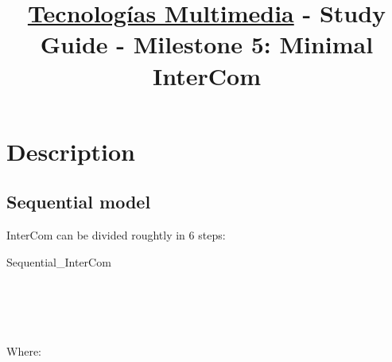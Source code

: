 \title{\href{https://www.ual.es/estudios/grados/presentacion/plandeestudios/asignatura/4015/40154321?idioma=zh_CN}{Tecnologías Multimedia} - Study Guide - Milestone 5: Minimal InterCom}

\maketitle

\section{Description}

\subsection{Sequential model}

InterCom can be divided roughtly in 6 steps:

\begin{pseudocode}{Sequential\_InterCom}{~}
  \BEGIN
     \GETS {}\\
     \GETS {}\\
    \\
     \GETS {}\\
     \GETS {}\\
  \END
  \ENDPROCEDURE
\end{pseudocode}

Where:

